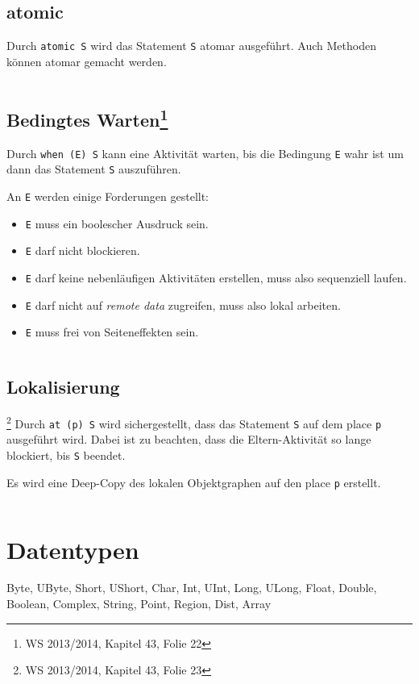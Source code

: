 \subsection{atomic}%
Durch \texttt{atomic S} wird das Statement \texttt{S} atomar ausgeführt. Auch
Methoden können atomar gemacht werden.

\inputminted[numbersep=5pt, tabsize=4]{scala}{scripts/x10/atomic-example.x10}

\subsection[Bedingtes Warten]{Bedingtes Warten\footnote{WS 2013/2014, Kapitel 43, Folie 22}}%
Durch \texttt{when (E) S} kann eine Aktivität warten, bis die Bedingung \texttt{E}
wahr ist um dann das Statement \texttt{S} auszuführen.

An \texttt{E} werden einige Forderungen gestellt:

\begin{itemize}
    \item \texttt{E} muss ein boolescher Ausdruck sein.
    \item \texttt{E} darf nicht blockieren.
    \item \texttt{E} darf keine nebenläufigen Aktivitäten erstellen, muss also
          sequenziell laufen.
    \item \texttt{E} darf nicht auf \textit{remote data} zugreifen, muss also
          lokal arbeiten.
    \item \texttt{E} muss frei von Seiteneffekten sein.
\end{itemize}

\inputminted[numbersep=5pt, tabsize=4]{scala}{scripts/x10/when-example.x10}

\subsection{Lokalisierung}\footnote{WS 2013/2014, Kapitel 43, Folie 23}%
Durch \texttt{at (p) S} wird sichergestellt, dass das Statement \texttt{S} auf
dem place \texttt{p} ausgeführt wird. Dabei ist zu beachten, dass die Eltern-Aktivität
so lange blockiert, bis \texttt{S} beendet.

Es wird eine Deep-Copy des lokalen Objektgraphen auf den place \texttt{p} erstellt.

\inputminted[numbersep=5pt, tabsize=4]{scala}{scripts/x10/at-example.x10}

\section{Datentypen}
Byte, UByte, Short, UShort, Char, Int, UInt, Long, ULong, Float, Double, Boolean, 
Complex, String, Point, Region, Dist, Array


